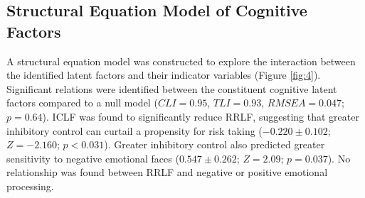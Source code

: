 \documentclass[utf8]{frontiersSCNS} %
\begin{document}
\subsection{Structural Equation Model of Cognitive Factors} A structural equation model was constructed to explore the interaction between the identified latent factors and their indicator variables (Figure \ref{fig:4}). Significant relations were identified between the constituent cognitive latent factors compared to a null model ($CLI = 0.95$, $TLI = 0.93$, $RMSEA = 0.047$; $p = 0.64$). ICLF was found to significantly reduce RRLF, suggesting that greater inhibitory control can curtail a propensity for risk taking ($-0.220\pm0.102$; $Z=-2.160$; $p<0.031$). Greater inhibitory control also predicted greater sensitivity to negative emotional faces ($0.547\pm0.262$; $Z=2.09$; $p = 0.037$). No relationship was found between RRLF and negative or positive emotional processing.
\end{document}
